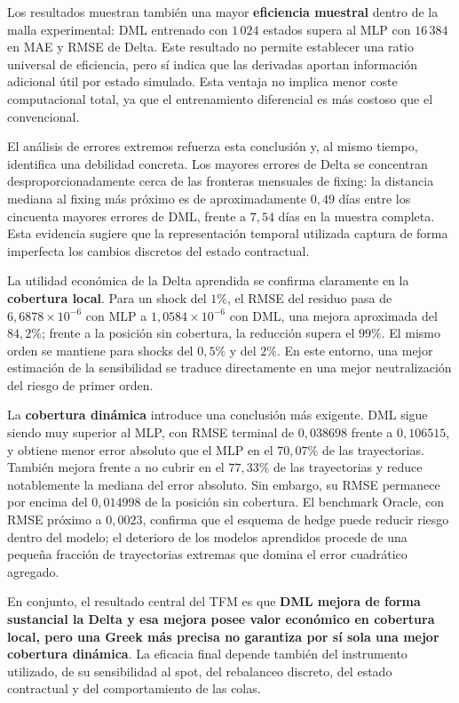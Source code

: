 Los resultados muestran también una mayor \textbf{eficiencia muestral} dentro de la malla experimental: DML entrenado con $1\,024$ estados supera al MLP con $16\,384$ en MAE y RMSE de Delta. Este resultado no permite establecer una ratio universal de eficiencia, pero sí indica que las derivadas aportan información adicional útil por estado simulado. Esta ventaja no implica menor coste computacional total, ya que el entrenamiento diferencial es más costoso que el convencional.

El análisis de errores extremos refuerza esta conclusión y, al mismo tiempo, identifica una debilidad concreta. Los mayores errores de Delta se concentran desproporcionadamente cerca de las fronteras mensuales de fixing: la distancia mediana al fixing más próximo es de aproximadamente $0{,}49$ días entre los cincuenta mayores errores de DML, frente a $7{,}54$ días en la muestra completa. Esta evidencia sugiere que la representación temporal utilizada captura de forma imperfecta los cambios discretos del estado contractual.

La utilidad económica de la Delta aprendida se confirma claramente en la \textbf{cobertura local}. Para un shock del $1\%$, el RMSE del residuo pasa de $6{,}6878\times10^{-6}$ con MLP a $1{,}0584\times10^{-6}$ con DML, una mejora aproximada del $84{,}2\%$; frente a la posición sin cobertura, la reducción supera el $99\%$. El mismo orden se mantiene para shocks del $0{,}5\%$ y del $2\%$. En este entorno, una mejor estimación de la sensibilidad se traduce directamente en una mejor neutralización del riesgo de primer orden.

La \textbf{cobertura dinámica} introduce una conclusión más exigente. DML sigue siendo muy superior al MLP, con RMSE terminal de $0{,}038698$ frente a $0{,}106515$, y obtiene menor error absoluto que el MLP en el $70{,}07\%$ de las trayectorias. También mejora frente a no cubrir en el $77{,}33\%$ de las trayectorias y reduce notablemente la mediana del error absoluto. Sin embargo, su RMSE permanece por encima del $0{,}014998$ de la posición sin cobertura. El benchmark Oracle, con RMSE próximo a $0{,}0023$, confirma que el esquema de hedge puede reducir riesgo dentro del modelo; el deterioro de los modelos aprendidos procede de una pequeña fracción de trayectorias extremas que domina el error cuadrático agregado.

En conjunto, el resultado central del TFM es que \textbf{DML mejora de forma sustancial la Delta y esa mejora posee valor económico en cobertura local, pero una Greek más precisa no garantiza por sí sola una mejor cobertura dinámica}. La eficacia final depende también del instrumento utilizado, de su sensibilidad al spot, del rebalanceo discreto, del estado contractual y del comportamiento de las colas.

